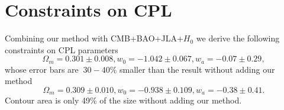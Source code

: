 \documentclass[useAMS,usenatbib]{mnras}
\begin{document}
\section{Constraints on CPL}


Combining our method with CMB+BAO+JLA+$H_0$ we derive the following constraints on CPL parameters
\begin{equation}
\Omega_m = 0.301 \pm 0.008, w_0 = -1.042 \pm 0.067, w_a = -0.07 \pm 0.29,    
\end{equation}
whose error bars are $~30-40\%$ smaller than the result without adding our method
\begin{equation}
\Omega_m = 0.309 \pm 0.010, w_0 = -0.938 \pm 0.109, w_a = -0.38 \pm 0.41.
\end{equation}
Contour area is only 49\% of the size without adding our method.
\end{document}
